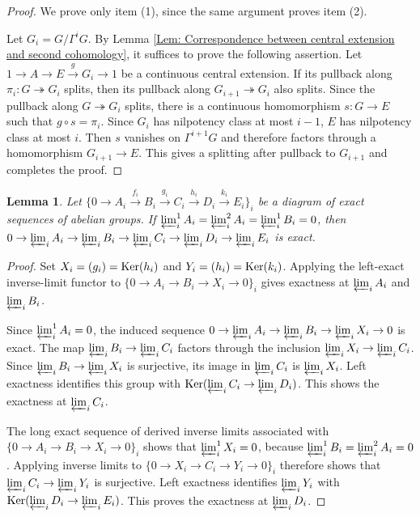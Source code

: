 \documentclass[11pt]{amsart}
\newtheorem{lemma}[theorem]{Lemma}
\theoremstyle{definition}
\numberwithin{equation}{section}
\numberwithin{equation}{section}
\let\Im\relax
\DeclareMathOperator{\Im}{Im}
\DeclareMathOperator{\Ker}{Ker}
\let\Im\relax
\DeclareMathOperator{\Im}{Im}
\begin{document}
\begin{proof}
We prove only item (1), since the same argument proves item (2).

Let $G_i=G/\Gamma^{i}G$. 
By Lemma \ref{Lem: Correspondence between central extension and second cohomology}, 
it suffices to prove the following assertion. Let $1\rightarrow A\rightarrow E\xrightarrow{g} G_{i}\rightarrow 1$ be a continuous central extension. If its pullback along $\pi_i:G\twoheadrightarrow G_{i}$ splits, then its pullback along $G_{i+1}\twoheadrightarrow G_{i}$ also splits. Since the pullback along $G\twoheadrightarrow G_{i}$ splits, there is a continuous homomorphism $s:G\rightarrow E$ such that $g\circ s=\pi_i$. Since $G_i$ has nilpotency class at most $i-1$, $E$ has nilpotency class at most $i$. Then $s$ vanishes on $\Gamma^{i+1}G$ and therefore factors through a homomorphism $G_{i+1}\rightarrow E$. This gives a splitting after pullback to $G_{i+1}$ and completes the proof.
\end{proof}

\begin{lemma}\label{Lem: exactness for inverse limit}
Let $\{0\rightarrow A_i\xrightarrow{f_i} B_i\xrightarrow{g_i} C_i\xrightarrow{h_i} D_i\xrightarrow{k_i} E_i\}_i$ be a diagram of exact sequences of abelian groups. If $\varprojlim^1_i A_i=\varprojlim^2_i A_i=\varprojlim^1_i B_i=0$, then $0\rightarrow \varprojlim_iA_i\rightarrow \varprojlim_iB_i\rightarrow \varprojlim_iC_i\rightarrow \varprojlim_iD_i\rightarrow \varprojlim_iE_i$ is exact.
\end{lemma}

\begin{proof}
Set $X_i=\Im(g_i)=\Ker(h_i)$ and $Y_i=\Im(h_i)=\Ker(k_i)$. Applying the left-exact inverse-limit functor to $\{0\rightarrow A_i\rightarrow B_i\rightarrow X_i\rightarrow 0\}_i$ gives exactness at $\varprojlim_iA_i$ and $\varprojlim_iB_i$.

Since $\varprojlim^1_i A_i=0$, the induced sequence $0\rightarrow \varprojlim_iA_i\rightarrow \varprojlim_iB_i\rightarrow \varprojlim_iX_i\rightarrow 0$ is exact. The map $\varprojlim_iB_i\rightarrow \varprojlim_iC_i$ factors through the inclusion $\varprojlim_iX_i\rightarrow \varprojlim_iC_i$. Since $\varprojlim_iB_i\rightarrow \varprojlim_iX_i$ is surjective, its image in $\varprojlim_iC_i$ is $\varprojlim_iX_i$. Left exactness identifies this group with $\Ker(\varprojlim_iC_i\rightarrow \varprojlim_iD_i)$. This shows the exactness at $\varprojlim_iC_i$.

The long exact sequence of derived inverse limits associated with $\{0\rightarrow A_i\rightarrow B_i\rightarrow X_i\rightarrow 0\}_i$ shows that $\varprojlim_i^1 X_i=0$, because $\varprojlim_i^1 B_i=\varprojlim_i^2 A_i=0$. Applying inverse limits to $\{0\rightarrow X_i\rightarrow C_i\rightarrow Y_i\rightarrow 0\}_i$ therefore shows that $\varprojlim_iC_i\rightarrow \varprojlim_iY_i$ is surjective. Left exactness identifies $\varprojlim_iY_i$ with $\Ker(\varprojlim_iD_i\rightarrow \varprojlim_iE_i)$. This proves the exactness at $\varprojlim_iD_i$.
\end{proof}
\end{document}

